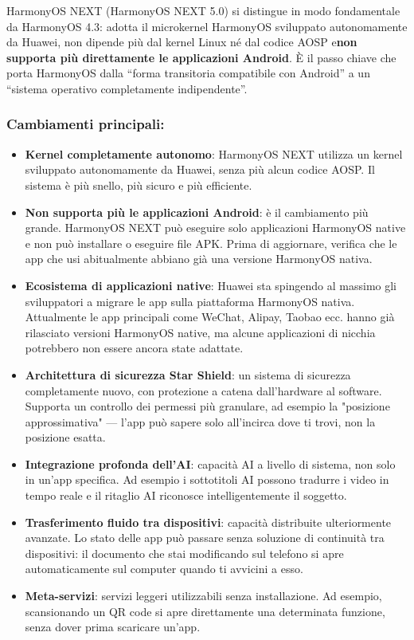 
HarmonyOS NEXT (HarmonyOS NEXT 5.0) si distingue in modo fondamentale da HarmonyOS 4.3: adotta il microkernel HarmonyOS sviluppato autonomamente da Huawei, non dipende più dal kernel Linux né dal codice AOSP e\textbf{non supporta più direttamente le applicazioni Android}. È il passo chiave che porta HarmonyOS dalla “forma transitoria compatibile con Android” a un “sistema operativo completamente indipendente”.

\subsubsection*{Cambiamenti principali:}

\begin{itemize}
  \item \textbf{Kernel completamente autonomo}: HarmonyOS NEXT utilizza un kernel sviluppato autonomamente da Huawei, senza più alcun codice AOSP. Il sistema è più snello, più sicuro e più efficiente.
  \item \textbf{Non supporta più le applicazioni Android}: è il cambiamento più grande. HarmonyOS NEXT può eseguire solo applicazioni HarmonyOS native e non può installare o eseguire file APK. Prima di aggiornare, verifica che le app che usi abitualmente abbiano già una versione HarmonyOS nativa.
  \item \textbf{Ecosistema di applicazioni native}: Huawei sta spingendo al massimo gli sviluppatori a migrare le app sulla piattaforma HarmonyOS nativa. Attualmente le app principali come WeChat, Alipay, Taobao ecc. hanno già rilasciato versioni HarmonyOS native, ma alcune applicazioni di nicchia potrebbero non essere ancora state adattate.
  \item \textbf{Architettura di sicurezza Star Shield}: un sistema di sicurezza completamente nuovo, con protezione a catena dall'hardware al software. Supporta un controllo dei permessi più granulare, ad esempio la "posizione approssimativa" — l'app può sapere solo all'incirca dove ti trovi, non la posizione esatta.
  \item \textbf{Integrazione profonda dell'AI}: capacità AI a livello di sistema, non solo in un'app specifica. Ad esempio i sottotitoli AI possono tradurre i video in tempo reale e il ritaglio AI riconosce intelligentemente il soggetto.
  \item \textbf{Trasferimento fluido tra dispositivi}: capacità distribuite ulteriormente avanzate. Lo stato delle app può passare senza soluzione di continuità tra dispositivi: il documento che stai modificando sul telefono si apre automaticamente sul computer quando ti avvicini a esso.
  \item \textbf{Meta-servizi}: servizi leggeri utilizzabili senza installazione. Ad esempio, scansionando un QR code si apre direttamente una determinata funzione, senza dover prima scaricare un'app.
\end{itemize}

